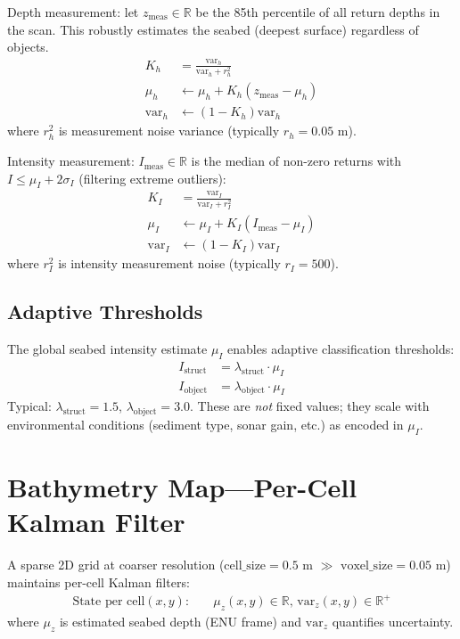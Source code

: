 \documentclass[10pt,twocolumn]{article}
\begin{document}
Depth measurement: let $z_{\text{meas}} \in \mathbb{R}$ be the 85th percentile of all return depths in the scan. This robustly estimates the seabed (deepest surface) regardless of objects.
\begin{align}
K_h &= \frac{\text{var}_h}{\text{var}_h + r_h^2} \label{eq:gain_h}\\
\mu_h &\leftarrow \mu_h + K_h(z_{\text{meas}} - \mu_h) \\
\text{var}_h &\leftarrow (1 - K_h) \text{var}_h
\end{align}
where $r_h^2$ is measurement noise variance (typically $r_h = 0.05$ m).

Intensity measurement: $I_{\text{meas}} \in \mathbb{R}$ is the median of non-zero returns with $I \leq \mu_I + 2\sigma_I$ (filtering extreme outliers):
\begin{align}
K_I &= \frac{\text{var}_I}{\text{var}_I + r_I^2} \label{eq:gain_I} \\
\mu_I &\leftarrow \mu_I + K_I(I_{\text{meas}} - \mu_I) \\
\text{var}_I &\leftarrow (1 - K_I) \text{var}_I
\end{align}
where $r_I^2$ is intensity measurement noise (typically $r_I = 500$).

\subsection{Adaptive Thresholds}

The global seabed intensity estimate $\mu_I$ enables adaptive classification thresholds:
\begin{align}
I_{\text{struct}} &= \lambda_{\text{struct}} \cdot \mu_I \label{eq:thresh_struct}\\
I_{\text{object}} &= \lambda_{\text{object}} \cdot \mu_I \label{eq:thresh_object}
\end{align}
Typical: $\lambda_{\text{struct}} = 1.5$, $\lambda_{\text{object}} = 3.0$. These are \emph{not} fixed values; they scale with environmental conditions (sediment type, sonar gain, etc.) as encoded in $\mu_I$.

\section{Bathymetry Map---Per-Cell Kalman Filter} \label{sec:bathy}

A sparse 2D grid at coarser resolution ($\text{cell\_size} = 0.5$ m $\gg$ $\text{voxel\_size} = 0.05$ m) maintains per-cell Kalman filters:
\begin{align}
\text{State per cell}(x,y): \quad &\mu_z(x,y) \in \mathbb{R}, \, \text{var}_z(x,y) \in \mathbb{R}^+
\end{align}
where $\mu_z$ is estimated seabed depth (ENU frame) and $\text{var}_z$ quantifies uncertainty.
\end{document}
